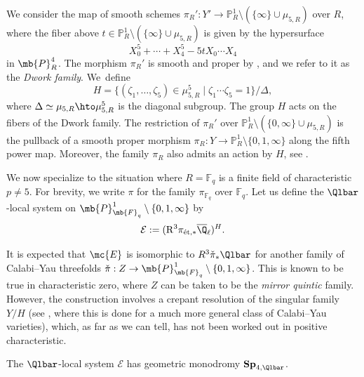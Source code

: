 We consider the map of smooth schemes $\pi_R'\colon Y'\to\mathbb{P}_{R}^1\setminus(\{\infty\}\cup\mu_{5,R})$ over $R$, where the fiber above $t\in \mathbb{P}_{R}^1\setminus(\{\infty\}\cup\mu_{5,R})$ is given by the hypersurface
\[
X_0^5+\cdots+X_4^5-5tX_0\cdots X_4
\]
in $\mb{P}_R^4$. The morphism $\pi_{R}'$ is smooth and proper by \cite[Lem.\,2.1]{Katz-Another-Look-at-the-Dwork-Family}, and we refer to it as the \emph{Dwork family}. We~define
\[
H=\{(\zeta_1,\dots,\zeta_5)\in\mu_{5,R}^5\mid\zeta_1\cdots\zeta_5=1\}/\Delta,
\]
where $\Delta\simeq \mu_{5, R}\hto\mu_{5,R}^5$ is the diagonal subgroup. The group $H$ acts on the fibers of the Dwork family. The restriction of $\pi_R'$ over $\mathbb{P}^1_R\setminus(\{0,\infty\}\cup\mu_{5,R})$ is the pullback of a smooth proper morphism $\pi_R\colon Y\to\mathbb{P}^1_R\setminus\{0,1,\infty\}$ along the fifth power map. Moreover, the family $\pi_R$ also admits an action by $H$, see \cite[p.\,102]{Katz-Another-Look-at-the-Dwork-Family}.

We now specialize to the situation where $R=\mathbb{F}_q$ is a finite field of characteristic $p\neq 5$. For brevity, we write $\pi$ for the family $\pi_{\mathbb{F}_q}$ over $\mathbb{F}_q$. Let us define the $\Qlbar$-local system on $\mb{P}^1_{\mb{F}_q}\setminus \{0,1,\infty\}$ by
\begin{equation}\label{eqn: mirrorquintic}
\mathcal{E}:=(\mathrm{R}^3\pi_{\textnormal{ét},\ast}\overline{\Q}_\ell)^H.
\end{equation}

\begin{rmk}
It is expected that $\mc{E}$ is isomorphic to $R^3\check{\pi}_{*}\Qlbar$ for another family of Calabi--Yau threefolds $\check{\pi}: Z \rightarrow \mb{P}^1_{\mb{F}_q}\setminus \{0,1,\infty\}$. This is known to be true in characteristic zero, where $Z$ can be taken to be the \emph{mirror quintic} family. However, the construction involves a crepant resolution of the singular family $Y/H$ (see \cite[Th.\,4.2.2]{Batyrev-Dual-Polyhedra-and-Mirror-Symmetry-for-Calabi-Yau-Hypersurfaces-in-Toric-Varieties}, where this is done for a much more general class of Calabi--Yau varieties), which, as far as we can tell, has not been worked out in positive characteristic.
\end{rmk}

\begin{lem}\label{lma: monodromy-of-Dwork-family}
The $\Qlbar$-local system $\mathcal{E}$ has geometric monodromy $\mathbf{Sp}_{4,\Qlbar}$.
\end{lem}

